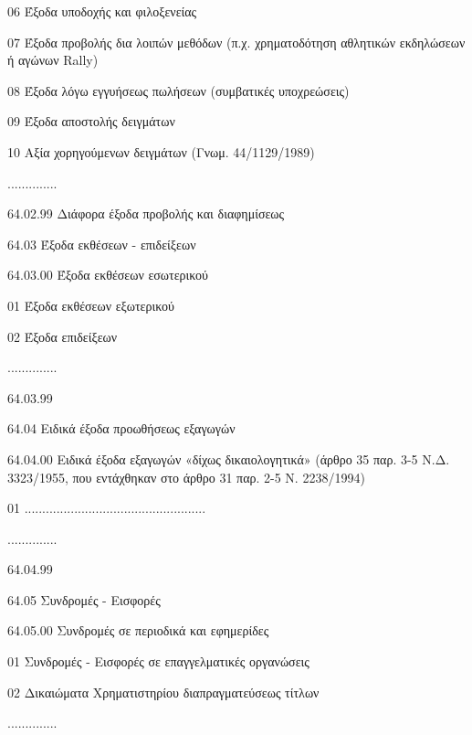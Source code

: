 \documentclass[A4,10pt,greek]{book}
\begin{document}
                                 06    Έξοδα υποδοχής και φιλοξενείας

                                 07   Έξοδα προβολής δια λοιπών μεθόδων (π.χ. χρηματοδότηση
                                         αθλητικών εκδηλώσεων ή αγώνων Rally)

                                 08   Έξοδα λόγω εγγυήσεως πωλήσεων (συμβατικές υποχρεώσεις)

                                 09   Έξοδα αποστολής δειγμάτων

                                 10   Αξία χορηγούμενων δειγμάτων (Γνωμ. 44/1129/1989)

                       ..............

                       64.02.99   Διάφορα έξοδα προβολής και διαφημίσεως

        64.03   Έξοδα εκθέσεων - επιδείξεων

                       64.03.00   Έξοδα εκθέσεων εσωτερικού

                                 01   Έξοδα εκθέσεων εξωτερικού

                                 02   Έξοδα επιδείξεων

                       ..............

                       64.03.99

        64.04   Ειδικά έξοδα προωθήσεως εξαγωγών

                       64.04.00    Ειδικά έξοδα εξαγωγών «δίχως δικαιολογητικά»
                                         (άρθρο 35 παρ. 3-5 Ν.Δ. 3323/1955, που εντάχθηκαν στο άρθρο
                                         31 παρ. 2-5 Ν. 2238/1994)

                                 01   ...................................................

                       ..............

                       64.04.99

        64.05   Συνδρομές - Εισφορές

                       64.05.00   Συνδρομές σε περιοδικά και εφημερίδες

                                 01   Συνδρομές - Εισφορές σε επαγγελματικές οργανώσεις

                                 02   Δικαιώματα Χρηματιστηρίου διαπραγματεύσεως τίτλων

                       ..............
\end{document}
